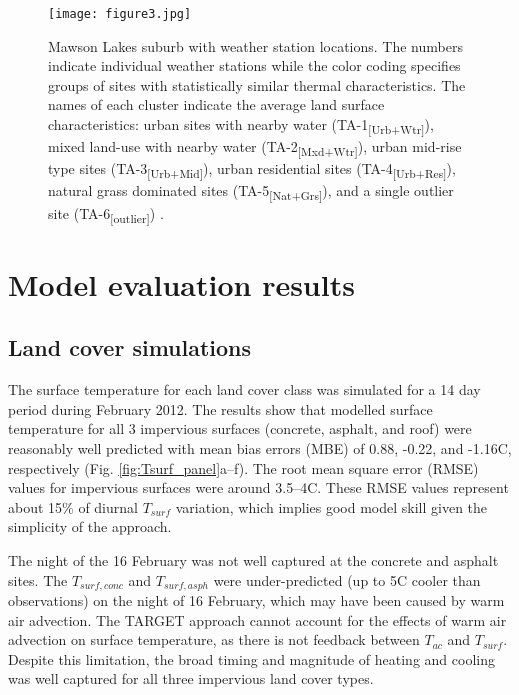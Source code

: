 \documentclass[gmd, manuscript]{copernicus}
\begin{document}
\begin{figure}[!htbp]
\begin{center}
\texttt{[image: figure3.jpg]}
 \caption{Mawson Lakes suburb with weather station locations. The numbers indicate individual weather stations while the color coding specifies groups of sites with statistically similar thermal characteristics.  The  names of each cluster indicate the average land surface characteristics: urban sites with nearby water ({TA-1\textsubscript{[Urb+Wtr]}}), mixed land-use with nearby water ({TA-2\textsubscript{[Mxd+Wtr]}}), urban mid-rise type sites ({TA-3\textsubscript{[Urb+Mid]}}), urban residential sites ({TA-4\textsubscript{[Urb+Res]}}), natural grass dominated sites ({TA-5\textsubscript{[Nat+Grs]}}), and a single outlier site (TA-6\textsubscript{[outlier]})  \citep{Broadbent2017}.} \label{fig:mawson}
\end{center} 
\end{figure}




\section{Model evaluation results}\label{sec:Results} 
\subsection{Land cover simulations}\label{sec:landcoverresult} 


The surface temperature for each land cover class was simulated for a 14 day period during February 2012. The results show that modelled surface temperature for all 3 impervious surfaces (concrete, asphalt, and roof) were reasonably well predicted with mean bias errors (MBE) of 0.88, -0.22, and -1.16\degree C, respectively (Fig. \ref{fig:Tsurf_panel}a--f). The root mean square error (RMSE) values for impervious surfaces were around 3.5--4\degree C. These RMSE values represent about 15\% of diurnal $T_{surf}$ variation, which implies good model skill given the simplicity of the approach.  



The night of the 16 February was not well captured at the concrete and asphalt sites. The $T_{surf,conc}$ and $T_{surf,asph}$ were under-predicted (up to 5\degree C cooler than observations) on the night of 16 February, which may have been caused by warm air advection. The TARGET approach  cannot account for the effects of warm air advection on surface temperature, as there is not feedback between $T_{ac}$ and $T_{surf}$.  Despite this limitation, the broad timing and magnitude of heating and cooling was well captured for all three impervious land cover types. 
\end{document}
